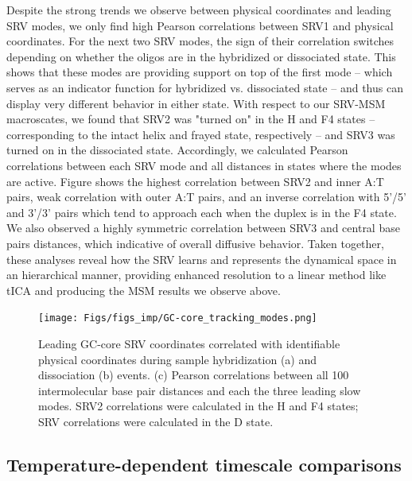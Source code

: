 \documentclass[journal=jpcbfk,manuscript=article]{achemso}
\begin{document}
Despite the strong trends we observe between physical coordinates and leading SRV modes, we only find high Pearson correlations between SRV1 and physical coordinates. For the next two SRV modes, the sign of their correlation switches depending on whether the oligos are in the hybridized or dissociated state. This shows that these modes are providing support on top of the first mode -- which serves as an indicator function for hybridized vs. dissociated state -- and thus can display very different behavior in either state. With respect to our SRV-MSM macroscates, we found that SRV2 was "turned on" in the H and F4 states -- corresponding to the intact helix and frayed state, respectively -- and SRV3 was turned on in the dissociated state. Accordingly, we calculated Pearson correlations between each SRV mode and all distances in states where the modes are active. Figure \label{fig:GC-core_tracking_modes} shows the highest correlation between SRV2 and inner A:T pairs, weak correlation with outer A:T pairs, and an inverse correlation with 5'/5' and 3'/3' pairs which tend to approach each when the duplex is in the F4 state. We also observed a highly symmetric correlation between SRV3 and central base pairs distances, which indicative of overall diffusive behavior. Taken together, these analyses reveal how the SRV learns and represents the dynamical space in an hierarchical manner, providing enhanced resolution to a linear method like tICA and producing the MSM results we observe above.


\begin{figure} %
	\begin{center}
        \texttt{[image: Figs/figs\_imp/GC-core\_tracking\_modes.png]}
        \caption{Leading GC-core SRV coordinates correlated with identifiable physical coordinates during sample hybridization (a) and dissociation (b) events. (c) Pearson correlations between all 100 intermolecular base pair distances and each the three leading slow modes. SRV2 correlations were calculated in the H and F4 states; SRV correlations were calculated in the D state.}
        \label{fig:GC-core_tracking_modes}
	\end{center}
\end{figure}    


\subsection{\label{sec:Results}Temperature-dependent timescale comparisons}
\end{document}
